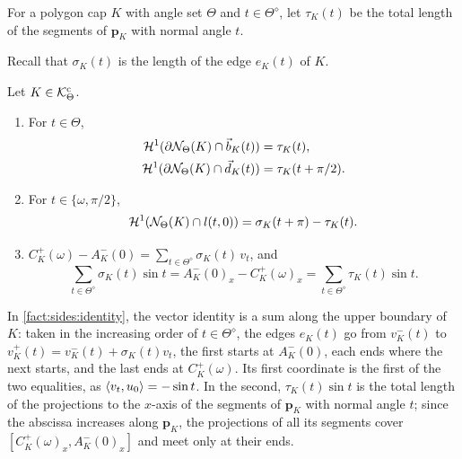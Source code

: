 \begin{definition}\label{def:tau}
For a polygon cap $K$ with angle set $\Theta$ and $t\in\Theta^\diamond$, let
$\tau_K(t)$ be the total length of the segments of $\mathbf p_K$ with normal
angle $t$.
\end{definition}

Recall that $\sigma_K(t)$ is the length of the edge $e_K(t)$ of $K$.

\begin{fact}\label{fact:sides}
Let $K\in\mathcal{K}^{\mathrm{c}}_\Theta$.
\begin{enumerate}[label=(\alph*)]
\item\label{fact:sides:wall} For $t\in\Theta$,
\begin{align*}
  \mathcal{H}^1(\partial\mathcal{N}_\Theta(K)\cap\vec b_K(t))&=\tau_K(t),\\
  \mathcal{H}^1(\partial\mathcal{N}_\Theta(K)\cap\vec d_K(t))&=\tau_K(t+\pi/2).
\end{align*}
\item\label{fact:sides:floor} For $t\in\{\omega,\pi/2\}$,
\[
  \mathcal{H}^1(\mathcal{N}_\Theta(K)\cap l(t,0))=\sigma_K(t+\pi)-\tau_K(t).
\]
\item\label{fact:sides:identity} $\displaystyle
C_K^+(\omega)-A_K^-(0)=\sum_{t\in\Theta^\diamond}\sigma_K(t)\,v_t$, and
\[
  \sum_{t\in\Theta^\diamond}\sigma_K(t)\sin t=A_K^-(0)_x-C_K^+(\omega)_x
    =\sum_{t\in\Theta^\diamond}\tau_K(t)\sin t .
\]
\end{enumerate}
\end{fact}

In \ref{fact:sides:identity}, the vector identity is a sum along the upper
boundary of $K$: taken in the increasing order of $t\in\Theta^\diamond$, the
edges $e_K(t)$ go from $v_K^-(t)$ to $v_K^+(t)=v_K^-(t)+\sigma_K(t)v_t$, the
first starts at $A_K^-(0)$, each ends where the next starts, and the last ends
at $C_K^+(\omega)$. Its first coordinate is the first of the two equalities, as
$\langle v_t,u_0\rangle=-\sin t$. In the second, $\tau_K(t)\sin t$ is the total length of
the projections to the $x$-axis of the segments of $\mathbf p_K$ with normal
angle $t$; since the abscissa increases along $\mathbf p_K$, the projections of
all its segments cover $[C_K^+(\omega)_x,A_K^-(0)_x]$ and meet only at their
ends.

